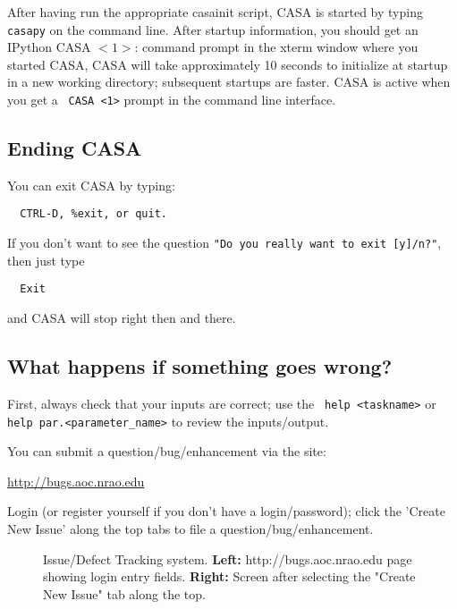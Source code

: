 After having run the appropriate casainit script, CASA is started by
typing {\tt casapy} on the command line.  After startup information,
you should get an IPython {\rm CASA $<1>$:} command prompt in the
xterm window where you started CASA, CASA will take approximately 10
seconds to initialize at startup in a new working directory;
subsequent startups are faster.  CASA is active when you get a {\tt
CASA <1>} prompt in the command line interface.

\subsection{Ending CASA}
\label{section:intro.basics.ending}

You can exit CASA by typing:
\small
\begin{verbatim}
  CTRL-D, %exit, or quit.
\end{verbatim}
\normalsize
If you don't want to see the question {\tt "Do you really want to exit
[y]/n?"}, then just type 
\small
\begin{verbatim}
  Exit 
\end{verbatim}
\normalsize
and CASA will stop right then and there.


\subsection{What happens if something goes wrong?}
\label{section:intro.basics.wrong}

First, always check that your inputs are correct; use the {\tt
help <taskname>} or
{\tt help par.<parameter\_name>} to review the inputs/output.

You can submit a question/bug/enhancement via the site:

\url{http://bugs.aoc.nrao.edu}

Login (or register yourself if you don't have a login/password); click
the 'Create New Issue' along the top tabs to file a
question/bug/enhancement.

\begin{figure}[h!]
\caption{\label{fig:jira} Issue/Defect Tracking system. {\bf Left:}
  http://bugs.aoc.nrao.edu page showing login entry fields. {\bf
  Right:} Screen after selecting the "Create New
  Issue" tab along the top.}
\hrulefill
\end{figure}

